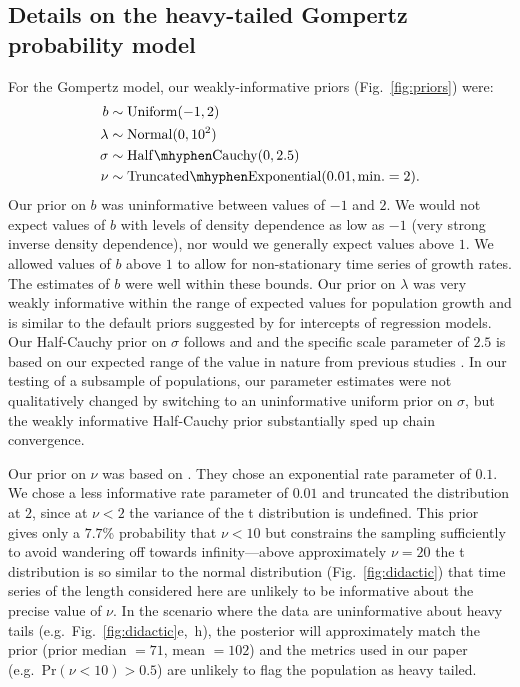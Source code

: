 \subsection{Details on the heavy-tailed Gompertz probability model}

For the Gompertz model, our weakly-informative priors (Fig.~\ref{fig:priors})
were:
\begin{align*}
b &\sim \mathrm{Uniform}(-1, 2)\\ \lambda &\sim \mathrm{Normal}(0, 10^2)\\
\sigma &\sim \mathrm{Half\mhyphen Cauchy} (0, 2.5)\\ \nu &\sim
\mathrm{Truncated\mhyphen Exponential}(0.01, \mathrm{min.} = 2).
\end{align*}
Our prior on $b$ was uninformative between values of $-1$ and $2$. We would
not expect values of $b$ with levels of density dependence as low as $-1$
(very strong inverse density dependence), nor would we generally expect values
above $1$. We allowed values of $b$ above $1$ to allow for non-stationary time
series of growth rates. The estimates of $b$ were well within these bounds.
Our prior on $\lambda$ was very weakly informative within the range of
expected values for population growth and is similar to the default priors
suggested by \citet{gelman2008d} for intercepts of regression models. Our
Half-Cauchy prior on $\sigma$ follows \citet{gelman2006c} and
\citet{gelman2008d} and the specific scale parameter of $2.5$ is based on our
expected range of the value in nature from previous studies
\citep[e.g.][]{connors2014}. In our testing of a subsample of populations, our
parameter estimates were not qualitatively changed by switching to an
uninformative uniform prior on $\sigma$, but the weakly informative
Half-Cauchy prior substantially sped up chain convergence.

Our prior on $\nu$ was based on \citet{fernandez1998}. They chose an
exponential rate parameter of $0.1$. We chose a less informative rate
parameter of $0.01$ and truncated the distribution at $2$, since at $\nu < 2$
the variance of the t distribution is undefined. This prior gives only a
$7.7$\% probability that $\nu < 10$ but constrains the sampling sufficiently
to avoid wandering off towards infinity---above approximately $\nu = 20$ the t
distribution is so similar to the normal distribution
(Fig.~\ref{fig:didactic}) that time series of the length considered here are
unlikely to be informative about the precise value of $\nu$. In the scenario
where the data are uninformative about heavy tails
(e.g.~Fig.~\ref{fig:didactic}e,~h), the posterior will approximately match the
prior (prior median $= 71$, mean $= 102$) and the metrics used in our paper
(e.g.~Pr$(\nu < 10) > 0.5$) are unlikely to flag the population as heavy
tailed.

